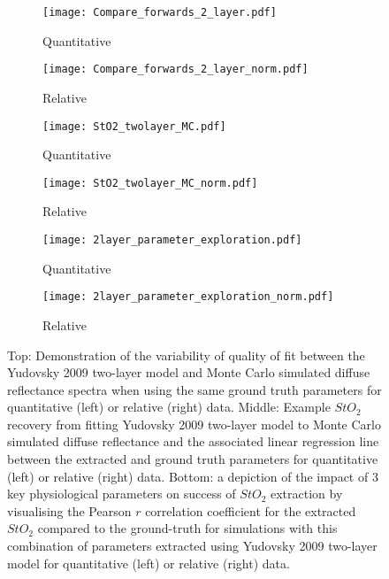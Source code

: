 \begin{figure}[htbp]
    \centering
    \begin{subfigure}{0.49\textwidth}
        \texttt{[image: Compare\_forwards\_2\_layer.pdf]}
        \caption{Quantitative}
        \label{fig:egtwolayerMCforwards}
    \end{subfigure}
    \begin{subfigure}{0.49\textwidth}
        \texttt{[image: Compare\_forwards\_2\_layer\_norm.pdf]}
        \caption{Relative}
        \label{fig:egtwolayerMCforwardsnorm}
    \end{subfigure}
    \begin{subfigure}{0.49\textwidth}
        \texttt{[image: StO2\_twolayer\_MC.pdf]}
        \caption{Quantitative}
        \label{fig:egparamsStO2MC}
    \end{subfigure}
    \begin{subfigure}{0.49\textwidth}
        \texttt{[image: StO2\_twolayer\_MC\_norm.pdf]}
        \caption{Relative}
        \label{fig:egparamsStO2MCnorm}
    \end{subfigure}
    \begin{subfigure}{0.49\textwidth}
        \texttt{[image: 2layer\_parameter\_exploration.pdf]}
        \caption{Quantitative}
        \label{fig:egparamsfailureMC}
    \end{subfigure}
    \begin{subfigure}{0.49\textwidth}
        \texttt{[image: 2layer\_parameter\_exploration\_norm.pdf]}
        \caption{Relative}
        \label{fig:egparamsfailureMCnorm}
    \end{subfigure}
    \caption{Top: Demonstration of the variability of quality of fit between the Yudovsky 2009 two-layer model and Monte Carlo simulated diffuse reflectance spectra when using the same ground truth parameters for quantitative (left) or relative (right) data. Middle: Example $StO_2$ recovery from fitting Yudovsky 2009 two-layer model to Monte Carlo simulated diffuse reflectance and the associated linear regression line between the extracted and ground truth parameters for quantitative (left) or relative (right) data. Bottom: a depiction of the impact of 3 key physiological parameters on success of $StO_2$ extraction by visualising the Pearson $r$ correlation coefficient for the extracted $StO_2$ compared to the ground-truth for simulations with this combination of parameters extracted using Yudovsky 2009 two-layer model for quantitative (left) or relative (right) data.}
    \label{fig:MC2layer}
\end{figure}

